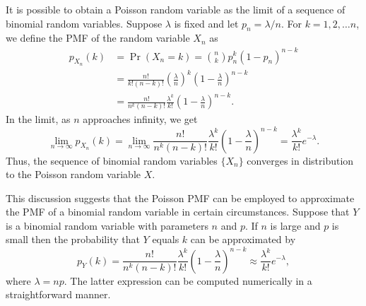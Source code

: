 It is possible to obtain a Poisson random variable as the limit of a sequence of binomial random variables.
Suppose $\lambda$ is fixed and let $p_n = \lambda/n$.
For $k = 1, 2, \ldots n$, we define the PMF of the random variable $X_n$ as
\begin{equation*}
\begin{split}
p_{X_n} (k) &= \Pr (X_n = k)
= \binom{n}{k} p_n^k (1-p_n)^{n-k} \\
&= \frac{n!}{k!(n-k)!} \left( \frac{\lambda}{n} \right)^k
\left( 1 - \frac{\lambda}{n} \right)^{n-k} \\
&= \frac{n!}{n^k (n-k)!} \frac{\lambda^k}{k!}
\left( 1 - \frac{\lambda}{n} \right)^{n-k} .
\end{split}
\end{equation*}
In the limit, as $n$ approaches infinity, we get
\begin{equation*}
\lim_{n \rightarrow \infty} p_{X_n} (k)
= \lim_{n \rightarrow \infty} \frac{n!}{n^k (n-k)!} \frac{\lambda^k}{k!}
\left( 1 - \frac{\lambda}{n} \right)^{n-k}
= \frac{\lambda^k}{k!} e^{- \lambda} .
\end{equation*}
Thus, the sequence of binomial random variables $\{ X_n \}$ converges in distribution to the Poisson random variable $X$.

This discussion suggests that the Poisson PMF can be employed to approximate the PMF of a binomial random variable in certain circumstances.
Suppose that $Y$ is a binomial random variable with parameters $n$ and $p$.
If $n$ is large and $p$ is small then the probability that $Y$ equals $k$ can be approximated by
\begin{equation*}
p_{Y} (k) = \frac{n!}{n^k (n-k)!} \frac{\lambda^k}{k!}
\left( 1 - \frac{\lambda}{n} \right)^{n-k}
\approx \frac{\lambda^k}{k!} e^{- \lambda} ,
\end{equation*}
where $\lambda = n p$.
The latter expression can be computed numerically in a straightforward manner.

